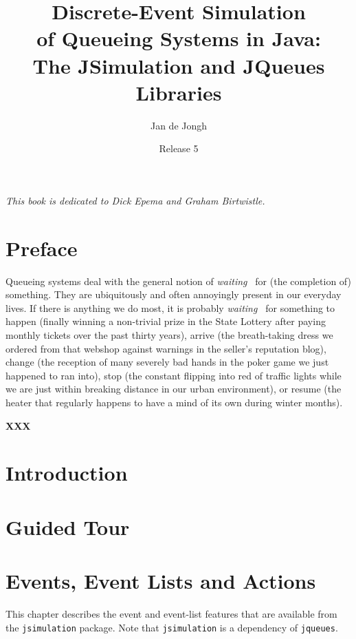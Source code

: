 \documentclass[12pt]{book}
\title{Discrete-Event Simulation\\
       of Queueing Systems in Java:\\
       The JSimulation and JQueues Libraries}
\author{Jan de Jongh}
\date{Release 5}
\begin{document}
\maketitle

\chapter*{}

{\em This book is dedicated to Dick Epema and Graham Birtwistle.}

\tableofcontents

\chapter{Preface}

Queueing systems deal with the general notion of {\em waiting\ }
  for (the completion of) something.
They are ubiquitously and often annoyingly present in our everyday lives.
If there is anything we do most,
  it is probably {\em waiting\ } for something to
  happen (finally winning a non-trivial prize in the State Lottery
          after paying monthly tickets over the past thirty years),
  arrive (the breath-taking dress we ordered from that webshop
          against warnings in the seller's reputation blog),
  change (the reception of many severely bad hands in the poker game
          we just happened to ran into),
  stop (the constant flipping into red of traffic lights
        while we are just within breaking distance
        in our urban environment),
  or resume (the heater that regularly happens to have
             a mind of its own during
             winter months).

{\bf XXX}

\chapter{Introduction}

\chapter{Guided Tour}

\chapter{Events, Event Lists and Actions}

This chapter describes the event and event-list features
  that are available from the \lstinline{jsimulation} package.
Note that \lstinline{jsimulation} is a dependency of \lstinline{jqueues}.
\end{document}
